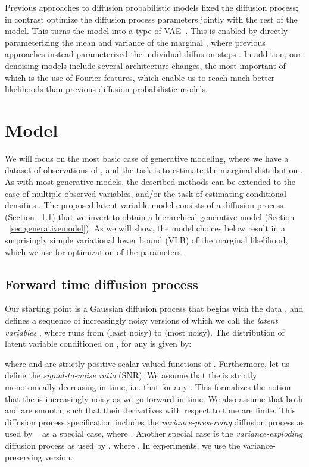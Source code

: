 \documentclass{article}
\begin{document}
Previous approaches to diffusion probabilistic models fixed the diffusion process; in contrast optimize the diffusion process parameters jointly with the rest of the model. This turns the model into a type of VAE~\citep{kingma2013auto,rezende2014stochastic}. This is enabled by directly parameterizing the mean and variance of the marginal , where previous approaches instead parameterized the individual diffusion steps . In addition, our denoising models include several architecture changes, the most important of which is the use of Fourier features, which enable us to reach much better likelihoods than previous diffusion probabilistic models.








\section{Model}
\label{sec:model}
We will focus on the most basic case of generative modeling, where we have a dataset of observations of , and the task is to estimate the marginal distribution . As with most generative models, the described methods can be extended to the case of multiple observed variables, and/or the task of estimating conditional densities . The proposed latent-variable model consists of a diffusion process (Section ~\ref{sec:inferencemodel}) that we invert to obtain a hierarchical generative model (Section ~\ref{sec:generativemodel}). As we will show, the model choices below result in a surprisingly simple variational lower bound (VLB) of the marginal likelihood, which we use for optimization of the parameters.

\subsection{Forward time diffusion process}\label{sec:inferencemodel}
Our starting point is a Gaussian diffusion process that begins with the data , and defines a sequence of increasingly noisy versions of  which we call the \emph{latent variables} , where  runs from  (least noisy) to  (most noisy).
The distribution of latent variable  conditioned on , for any  is given by:

where   and  are strictly positive scalar-valued functions of . Furthermore, let us define the \emph{signal-to-noise ratio} (SNR): 
We assume that the  is strictly monotonically decreasing in time, i.e. that  for any . This formalizes the notion that the  is increasingly noisy as we go forward in time. We also assume that both  and  are smooth, such that their derivatives with respect to time  are finite.  This diffusion process specification includes the \emph{variance-preserving} diffusion process as used by ~\citep{sohl2015deep,ho2020denoising} as a special case, where . Another special case is the \emph{variance-exploding} diffusion process as used by \citep{song2019generative,song2020score}, where . In experiments, we use the variance-preserving version.
\end{document}
